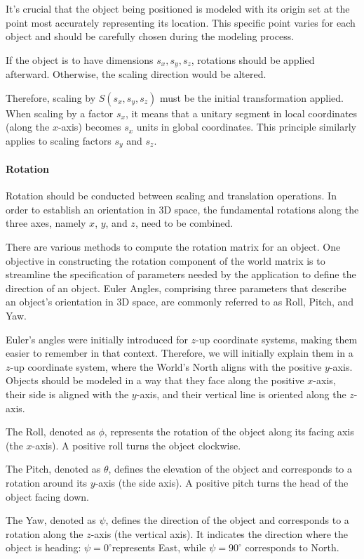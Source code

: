 It's crucial that the object being positioned is modeled with its origin set at the point most accurately representing its location. 
This specific point varies for each object and should be carefully chosen during the modeling process.

If the object is to have dimensions $s_x,s_y,s_z$, rotations should be applied afterward. 
Otherwise, the scaling direction would be altered. 

Therefore, scaling by $S(s_x,s_y,s_z)$ must be the initial transformation applied.
When scaling by a factor $s_x$, it means that a unitary segment in local coordinates (along the $x$-axis) becomes $s_x$ units in global coordinates. 
This principle similarly applies to scaling factors $s_y$ and $s_z$.

\paragraph*{Rotation}
Rotation should be conducted between scaling and translation operations. 
In order to establish an orientation in 3D space, the fundamental rotations along the three axes, namely $x$, $y$, and $z$, need to be combined.

There are various methods to compute the rotation matrix for an object. 
One objective in constructing the rotation component of the world matrix is to streamline the specification of parameters needed by the application to define the direction of an object. 
Euler Angles, comprising three parameters that describe an object's orientation in 3D space, are commonly referred to as Roll, Pitch, and Yaw.

Euler's angles were initially introduced for $z$-up coordinate systems, making them easier to remember in that context.
Therefore, we will initially explain them in a $z$-up coordinate system, where the World's North aligns with the positive $y$-axis.
Objects should be modeled in a way that they face along the positive $x$-axis, their side is aligned with the $y$-axis, and their vertical line is oriented along the $z$-axis.

The Roll, denoted as $\phi$, represents the rotation of the object along its facing axis (the $x$-axis).
A positive roll turns the object clockwise.

The Pitch, denoted as $\theta$, defines the elevation of the object and corresponds to a rotation around its $y$-axis (the side axis).
A positive pitch turns the head of the object facing down.

The Yaw, denoted as $\psi$, defines the direction of the object and corresponds to a rotation along the $z$-axis (the vertical axis).
It indicates the direction where the object is heading: $\psi=0^\circ$represents East, while $\psi=90^\circ$ corresponds to North.

